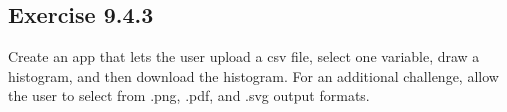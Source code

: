 \documentclass[]{book}
\newenvironment{Shaded}{\begin{snugshade}}{\end{snugshade}}
\newcommand{\CommentTok}[1]{\textcolor[rgb]{0.56,0.35,0.01}{\textit{#1}}}
\newcommand{\DataTypeTok}[1]{\textcolor[rgb]{0.13,0.29,0.53}{#1}}
\newcommand{\KeywordTok}[1]{\textcolor[rgb]{0.13,0.29,0.53}{\textbf{#1}}}
\newcommand{\NormalTok}[1]{#1}
\newcommand{\OperatorTok}[1]{\textcolor[rgb]{0.81,0.36,0.00}{\textbf{#1}}}
\newcommand{\StringTok}[1]{\textcolor[rgb]{0.31,0.60,0.02}{#1}}
\begin{document}
\begin{solution}
\begin{Shaded}
\end{Shaded}

\end{solution}

\hypertarget{exercise-9.4.3}{%
\subsection*{Exercise 9.4.3}\label{exercise-9.4.3}}

Create an app that lets the user upload a csv file, select one variable, draw a histogram, and then download the histogram. For an additional challenge, allow the user to select from .png, .pdf, and .svg output formats.
\end{document}
